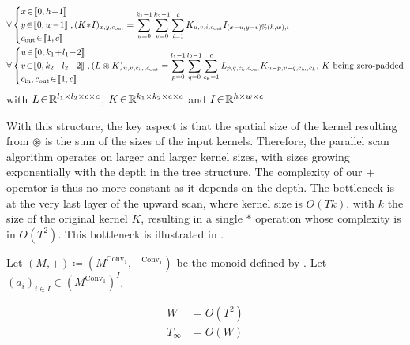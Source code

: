 \begin{align*}
    & \forall \left\{
\begin{aligned}
    &x\!\in\!\intint{0}{h\!-\!1}\\
    &y\!\in\!\intint{0}{w\!-\!1}\\
    &c_{\mathrm{out}}\!\in\!\intint{1}{c}
\end{aligned}
\right., (K\!\ast\!I)_{x,y,c_{\mathrm{out}}} = \sum_{u=0}^{k_1-1}\sum_{v=0}^{k_2-1}\sum_{i=1}^{c} K_{u,v,i,c_{\mathrm{out}}} I_{(x-u,y-v)\%(h,w),i}\\
    & \forall \left\{
\begin{aligned}
    &u\!\in\!\intint{0}{k_1\!+\!l_1\!-\!2}\\
    &v\!\in\!\intint{0}{k_2\!+\!l_2\!-\!2}\\
    &c_{\mathrm{in}},c_{\mathrm{out}}\!\in\!\intint{1}{c}
\end{aligned}
\right., (L \circledast K)_{u,v,c_{\mathrm{in}},c_{\mathrm{out}}} = \sum_{p=0}^{l_1-1}\sum_{q=0}^{l_2-1}\sum_{c_{k}=1}^{c} L_{p,q,c_{k},c_{\mathrm{out}}} K_{u-p,v-q,c_{\mathrm{in}},c_{k}}\text{, $K$ being zero-padded}
\end{align*}
\noindent with $L\!\in\!\mathbb{R}^{l_1\times l_2\times c \times c}$, $K\!\in\!\mathbb{R}^{k_1\times k_2\times c \times c}$ and $I\!\in\!\mathbb{R}^{h \times w \times c}$

With this structure, the key aspect is that the spatial size of the kernel resulting from $\circledast$ is the sum of the sizes of the input kernels. Therefore, the parallel scan algorithm operates on larger and larger kernel sizes, with sizes growing exponentially with the depth in the tree structure. The complexity of our $+$ operator is thus no more constant as it depends on the depth. The bottleneck is at the very last layer of the upward scan, where kernel size is $O(Tk)$, with $k$ the size of the original kernel $K$, resulting in a single $\ast$ operation whose complexity is in $O(T^2)$. This bottleneck is illustrated in .

\begin{proposition}
    Let $(M, +) \coloneqq (M^{\mathrm{Conv}_1}, +^{\mathrm{Conv}_1})$ be the monoid defined by . Let $(a_i)_{i\in I}\in (M^{\mathrm{Conv}_1})^I$.

\begin{align}
    W&= O(T^2)\\
    T_\infty&= O(W)
\end{align}
\end{proposition}

